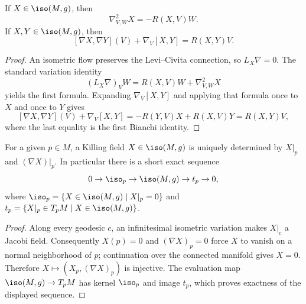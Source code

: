 \begin{proposition}
  \label{prop:pet-ch8-killing-curvature-identities}

  If $X\in\iso(M,g)$, then
  \[
    \nabla^2_{V,W}X=-R(X,V)W.
  \]
  If $X,Y\in\iso(M,g)$, then
  \[
    [\nabla X,\nabla Y](V)+\nabla_V[X,Y]=R(X,Y)V.
  \]
\end{proposition}
\begin{proof}
  \sketch
  An isometric flow preserves the Levi--Civita connection, so
  \(L_X\nabla=0\). The standard variation identity
  \[
    (L_X\nabla)_VW=R(X,V)W+\nabla^2_{V,W}X
  \]
  yields the first formula. Expanding \(\nabla_V[X,Y]\) and applying that
  formula once to \(X\) and once to \(Y\) gives
  \[
    [\nabla X,\nabla Y](V)+\nabla_V[X,Y]
    =-R(Y,V)X+R(X,V)Y=R(X,Y)V,
  \]
  where the last equality is the first Bianchi identity.
\end{proof}

\begin{proposition}
  \label{prop:pet-ch8-killing-uniqueness}

  For a given $p\in M$, a Killing field $X\in\iso(M,g)$ is uniquely determined by
  $X|_p$ and $(\nabla X)|_p$. In particular there is a short exact sequence
  \[
    0\to\iso_p\to\iso(M,g)\to t_p\to0,
  \]
  where $\iso_p=\{X\in\iso(M,g)\mid X|_p=0\}$ and
  $t_p=\{X|_p\in T_pM\mid X\in\iso(M,g)\}$.
\end{proposition}
\begin{proof}
  \sketch
  Along every geodesic \(c\), an infinitesimal isometric variation makes
  \(X|_c\) a Jacobi field. Consequently \(X(p)=0\) and
  \((\nabla X)_p=0\) force \(X\) to vanish on a normal neighborhood of \(p\);
  continuation over the connected manifold gives \(X=0\). Therefore
  \(X\mapsto(X_p,(\nabla X)_p)\) is injective. The evaluation map
  \(\iso(M,g)\to T_pM\) has kernel \(\iso_p\) and image \(t_p\), which proves
  exactness of the displayed sequence.
\end{proof}

